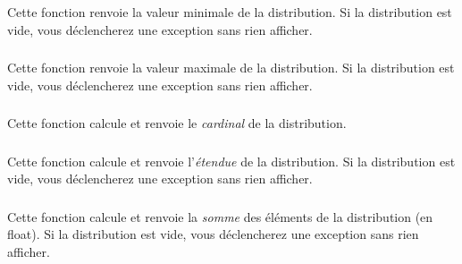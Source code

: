 
\subsubsection*{}

\noindent Cette fonction renvoie la valeur minimale de la distribution.
Si la distribution est vide, vous déclencherez une exception  sans rien afficher.


\subsubsection*{}

\noindent Cette fonction renvoie la valeur maximale de la distribution.
Si la distribution est vide, vous déclencherez une exception  sans rien afficher.


\subsubsection*{}

\noindent Cette fonction calcule et renvoie le \textit{cardinal} de la distribution.


\subsubsection*{}

\noindent Cette fonction calcule et renvoie l'\textit{étendue} de la distribution.
Si la distribution est vide, vous déclencherez une exception  sans rien afficher.



\subsubsection*{}

\noindent Cette fonction calcule et renvoie la \textit{somme} des éléments de la distribution (en float).
Si la distribution est vide, vous déclencherez une exception  sans rien afficher.


